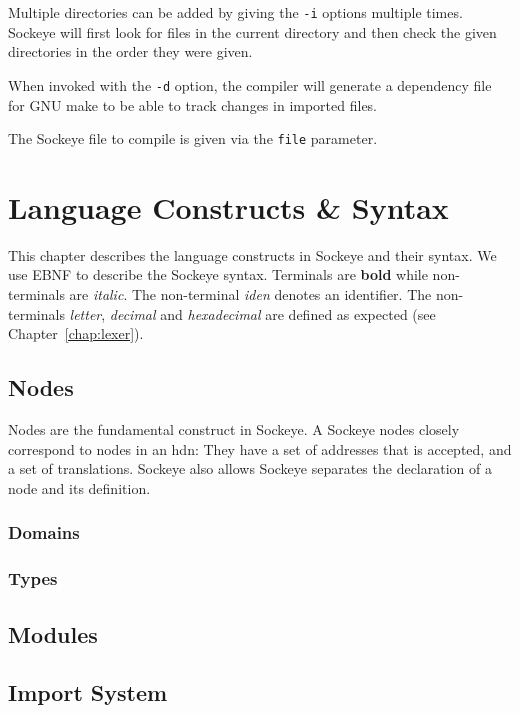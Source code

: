 \documentclass[a4paper,11pt,twoside]{report}
\begin{document}
{{{Multiple directories can be added by giving the \texttt{-i} options multiple times.
Sockeye will first look for files in the current directory and then check the given directories in the order they were given.

When invoked with the \texttt{-d} option, the compiler will generate a dependency file for GNU make to be able to track changes in imported files.

The Sockeye file to compile is given via the \texttt{file} parameter.


\chapter{Language Constructs \& Syntax}
\label{chap:syntax}
This chapter describes the language constructs in Sockeye and their syntax.
We use EBNF to describe the Sockeye syntax. Terminals are \textbf{bold} while non-terminals are \textit{italic}.
The non-terminal \textit{iden} denotes an identifier.
The non-terminals \textit{letter}, \textit{decimal} and \textit{hexadecimal} are defined as expected (see Chapter~\ref{chap:lexer}).

\section{Nodes}
Nodes are the fundamental construct in Sockeye.
A Sockeye nodes closely correspond to nodes in an \gls{hdn}:
They have a set of addresses that is accepted, and a set of translations.
Sockeye also allows
Sockeye separates the declaration of a node and its definition.

\subsection{Domains}

\subsection{Types}

\section{Modules}

\section{Import System}

}}}
\end{document}
